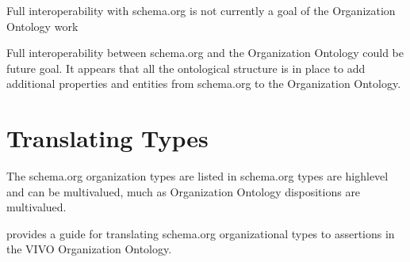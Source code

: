 \documentclass[letterpaper,10pt,english]{sphinxmanual}
\begin{document}
\sphinxAtStartPar
Full interoperability with schema.org is not currently a goal of the Organization
Ontology work \sphinxstepexplicit %
\begin{footnote}[1]\label{\thesphinxscope.1}%
\sphinxAtStartFootnote
Full interoperability between schema.org and the Organization Ontology could be
future goal.  It appears that all the ontological structure is in place to add
additional
properties and entities from schema.org to the Organization Ontology.
%
\end{footnote}


\section{Translating Types}
\label{\detokenize{schema-to-org:translating-types}}
\sphinxAtStartPar
The schema.org organization types are listed in {\hyperref[\detokenize{schema-to-org:table-18}]{}}  schema.org types are
high\sphinxhyphen{}level and can
be multi\sphinxhyphen{}valued, much as Organization Ontology dispositions are multi\sphinxhyphen{}valued.

\sphinxAtStartPar
{\hyperref[\detokenize{schema-to-org:table-18}]{}} provides a guide for translating schema.org organizational types to assertions
in the VIVO Organization Ontology.
\end{document}
